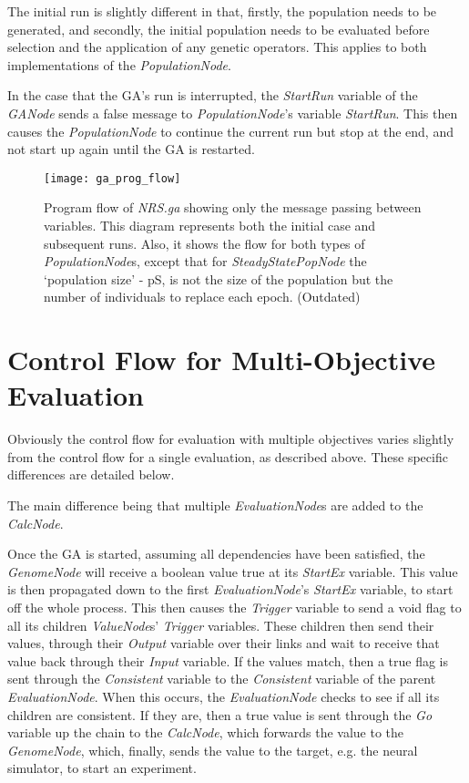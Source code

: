 \documentclass[10pt, notitlepage, a4paper]{article}
\begin{document}
The initial run is slightly different in that, firstly, the population needs to be generated, and secondly, the initial population needs to be evaluated before selection and the application of any genetic operators. This applies to both implementations of the {\it PopulationNode}.

In the case that the GA's run is interrupted, the {\it StartRun} variable of the {\it GANode} sends a false message to {\it PopulationNode}'s variable {\it StartRun}. This then causes the {\it PopulationNode} to continue the current run but stop at the end, and not start up again until the GA is restarted.

\begin{figure}[ht]
\begin{center}
\texttt{[image: ga\_prog\_flow]}
\end{center}
\caption{Program flow of {\it NRS.ga} showing only the message passing between variables. This diagram represents both the initial case and subsequent runs. Also, it shows the flow for both types of {\it PopulationNode}s, except that for {\it SteadyStatePopNode} the `population size' - pS, is not the size of the population but the number of individuals to replace each epoch. (Outdated)}
\label{p_flow}
\end{figure}

\section{Control Flow for Multi-Objective Evaluation}
Obviously the control flow for evaluation with multiple objectives varies slightly from the control flow for a single evaluation, as described above. These specific differences are detailed below.

The main difference being that multiple {\it EvaluationNode}s are added to the {\it CalcNode}.

Once the GA is started, assuming all dependencies have been satisfied, the {\it GenomeNode} will receive a boolean value true at its {\it StartEx} variable. This value is then propagated down to the first {\it EvaluationNode}'s {\it StartEx} variable, to start off the whole process. This then causes the {\it Trigger} variable to send a void flag to all its children {\it ValueNode}s' {\it Trigger} variables. These children then send their values, through their {\it Output} variable over their links and wait to receive that value back through their {\it Input} variable. If the values match, then a true flag is sent through the {\it Consistent} variable to the {\it Consistent} variable of the parent {\it EvaluationNode}. When this occurs, the {\it EvaluationNode} checks to see if all its children are consistent. If they are, then a true value is sent through the {\it Go} variable up the chain to the {\it CalcNode}, which forwards the value to the {\it GenomeNode}, which, finally, sends the value to the target, e.g. the neural simulator, to start an experiment.
\end{document}
